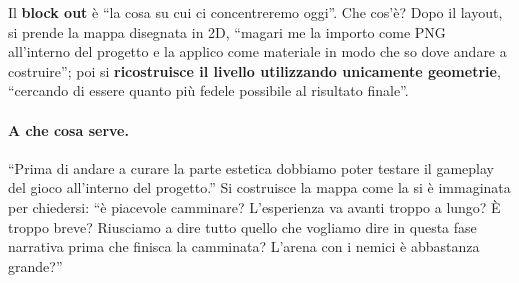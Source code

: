 Il \textbf{block out} è ``la cosa su cui ci concentreremo oggi''. Che cos'è? Dopo il
layout, si prende la mappa disegnata in 2D, ``magari me la importo come PNG all'interno del
progetto e la applico come materiale in modo che so dove andare a costruire''; poi si
\textbf{ricostruisce il livello utilizzando unicamente geometrie}, ``cercando di essere
quanto più fedele possibile al risultato finale''.

\paragraph{A che cosa serve.} ``Prima di andare a curare la parte estetica dobbiamo poter
testare il gameplay del gioco all'interno del progetto.'' Si costruisce la mappa come la si
è immaginata per chiedersi: ``è piacevole camminare? L'esperienza va avanti troppo a
lungo? È troppo breve? Riusciamo a dire tutto quello che vogliamo dire in questa fase
narrativa prima che finisca la camminata? L'arena con i nemici è abbastanza grande?''

